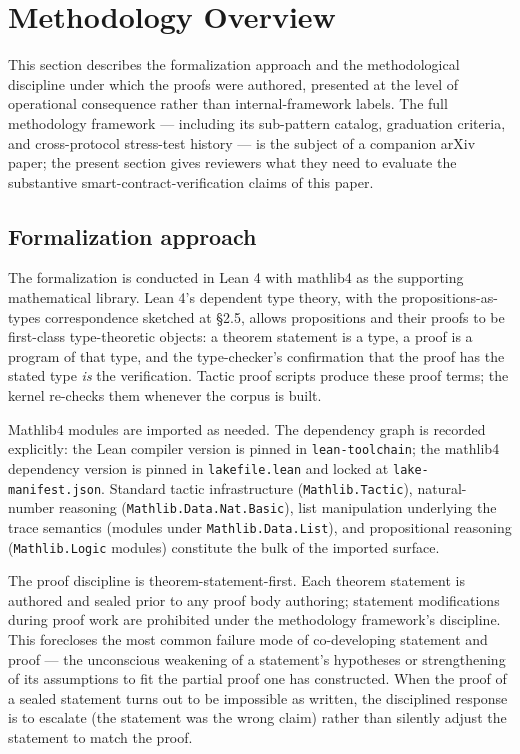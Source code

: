 \section{Methodology Overview}\label{methodology-overview}

This section describes the formalization approach and the methodological
discipline under which the proofs were authored, presented at the level
of operational consequence rather than internal-framework labels. The
full methodology framework --- including its sub-pattern catalog,
graduation criteria, and cross-protocol stress-test history --- is the
subject of a companion arXiv paper; the present section gives reviewers
what they need to evaluate the substantive smart-contract-verification
claims of this paper.

\subsection{Formalization approach}\label{formalization-approach}

The formalization is conducted in Lean 4 with mathlib4 as the supporting
mathematical library. Lean 4's dependent type theory, with the
propositions-as-types correspondence sketched at §2.5, allows
propositions and their proofs to be first-class type-theoretic objects:
a theorem statement is a type, a proof is a program of that type, and
the type-checker's confirmation that the proof has the stated type
\emph{is} the verification. Tactic proof scripts produce these proof
terms; the kernel re-checks them whenever the corpus is built.

Mathlib4 modules are imported as needed. The dependency graph is
recorded explicitly: the Lean compiler version is pinned in
\texttt{lean-toolchain}; the mathlib4 dependency version is pinned in
\texttt{lakefile.lean} and locked at \texttt{lake-manifest.json}.
Standard tactic infrastructure (\texttt{Mathlib.Tactic}), natural-number
reasoning (\texttt{Mathlib.Data.Nat.Basic}), list manipulation
underlying the trace semantics (modules under
\texttt{Mathlib.Data.List}), and propositional reasoning
(\texttt{Mathlib.Logic} modules) constitute the bulk of the imported
surface.

The proof discipline is theorem-statement-first. Each theorem statement
is authored and sealed prior to any proof body authoring; statement
modifications during proof work are prohibited under the methodology
framework's discipline. This forecloses the most common failure mode of
co-developing statement and proof --- the unconscious weakening of a
statement's hypotheses or strengthening of its assumptions to fit the
partial proof one has constructed. When the proof of a sealed statement
turns out to be impossible as written, the disciplined response is to
escalate (the statement was the wrong claim) rather than silently adjust
the statement to match the proof.

